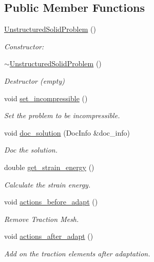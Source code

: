 \subsection*{Public Member Functions}
\begin{DoxyCompactItemize}
\item 
\hyperlink{classUnstructuredSolidProblem_a18ce02b6e4bbc86403c9e1b32c095772}{Unstructured\+Solid\+Problem} ()
\begin{DoxyCompactList}\small\item\em Constructor\+: \end{DoxyCompactList}\item 
\hyperlink{classUnstructuredSolidProblem_a25fe105d949498bf8f7c15aff96a7d00}{$\sim$\+Unstructured\+Solid\+Problem} ()
\begin{DoxyCompactList}\small\item\em Destructor (empty) \end{DoxyCompactList}\item 
void \hyperlink{classUnstructuredSolidProblem_a9b725d83bc051b594d080a40d6d317d3}{set\+\_\+incompressible} ()
\begin{DoxyCompactList}\small\item\em Set the problem to be incompressible. \end{DoxyCompactList}\item 
void \hyperlink{classUnstructuredSolidProblem_ab3d66fd61b69d12b4f159d763fc44f15}{doc\+\_\+solution} (Doc\+Info \&doc\+\_\+info)
\begin{DoxyCompactList}\small\item\em Doc the solution. \end{DoxyCompactList}\item 
double \hyperlink{classUnstructuredSolidProblem_a4da918a1f0cf94ebccc5112b58c28ece}{get\+\_\+strain\+\_\+energy} ()
\begin{DoxyCompactList}\small\item\em Calculate the strain energy. \end{DoxyCompactList}\item 
void \hyperlink{classUnstructuredSolidProblem_a463b4b976fdd12129ac2bd23bece1b8b}{actions\+\_\+before\+\_\+adapt} ()
\begin{DoxyCompactList}\small\item\em Remove Traction Mesh. \end{DoxyCompactList}\item 
void \hyperlink{classUnstructuredSolidProblem_acf0bbf57534a1516a633d702d9fd21ab}{actions\+\_\+after\+\_\+adapt} ()
\begin{DoxyCompactList}\small\item\em Add on the traction elements after adaptation. \end{DoxyCompactList}\end{DoxyCompactItemize}
